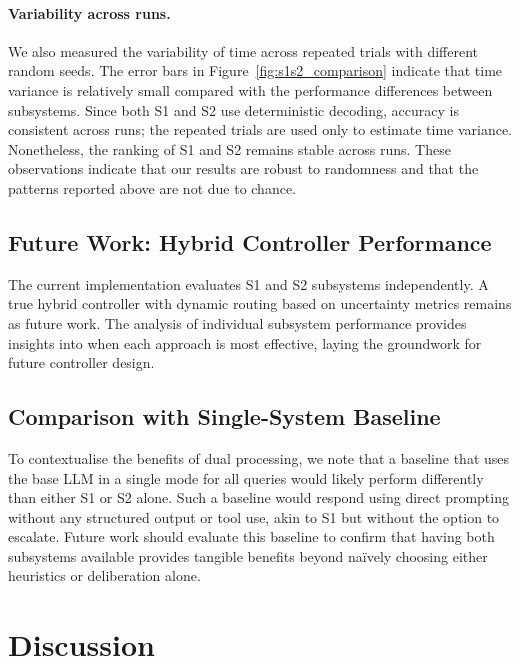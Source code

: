 \documentclass[11pt]{article}
\begin{document}
\paragraph{Variability across runs.}  We also measured the variability
of time across repeated trials with different random seeds.  The
error bars in Figure~\ref{fig:s1s2_comparison} indicate that time variance
is relatively small compared with the performance differences between
subsystems.  Since both S1 and S2 use deterministic decoding, accuracy is consistent across runs; the repeated trials are used only to estimate time variance.
Nonetheless, the ranking of S1 and S2 remains stable across runs.  These observations indicate that our
results are robust to randomness and that the patterns reported above
are not due to chance.



\subsection{Future Work: Hybrid Controller Performance}
The current implementation evaluates S1 and S2 subsystems independently.
A true hybrid controller with dynamic routing based on uncertainty metrics
remains as future work.  The analysis of individual subsystem performance provides insights into
when each approach is most effective, laying the groundwork for future
controller design.
\subsection{Comparison with Single-System Baseline}
To contextualise the benefits of dual processing, we note that a baseline
that uses the base LLM in a single mode for all queries would likely
perform differently than either S1 or S2 alone.  Such a baseline would
respond using direct prompting without any structured output or tool use,
akin to S1 but without the option to escalate.  Future work should
evaluate this baseline to confirm that having both subsystems available
provides tangible benefits beyond naïvely choosing either heuristics
or deliberation alone.

\section{Discussion}
\label{sec:discussion}
\end{document}
